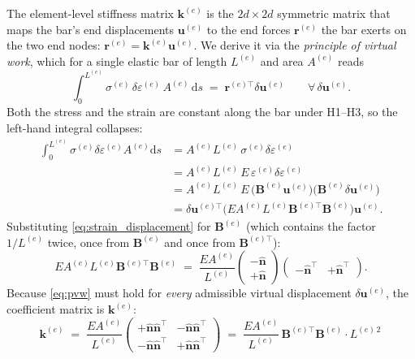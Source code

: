 The element-level stiffness matrix $\mathbf{k}^{(e)}$ is the
$2d\times 2d$ symmetric matrix that maps the bar's end
displacements $\mathbf{u}^{(e)}$ to the end forces
$\mathbf{r}^{(e)}$ the bar exerts on the two end nodes:
$\mathbf{r}^{(e)}=\mathbf{k}^{(e)}\mathbf{u}^{(e)}$. We derive
it via the \emph{principle of virtual work}, which for a single
elastic bar of length $L^{(e)}$ and area $A^{(e)}$ reads
\begin{equation}
  \int_0^{L^{(e)}}\!\!\sigma^{(e)}\,\delta\varepsilon^{(e)}\,A^{(e)}\,\mathrm{d}s
  \;=\;\mathbf{r}^{(e)\top}\delta\mathbf{u}^{(e)}
  \qquad\forall\,\delta\mathbf{u}^{(e)}.
  \label{eq:pvw}
\end{equation}
Both the stress and the strain are constant along the bar under
H1--H3, so the left-hand integral collapses:
\begin{align}
  \int_0^{L^{(e)}}\sigma^{(e)}\delta\varepsilon^{(e)}A^{(e)}\mathrm{d}s
  &= A^{(e)}L^{(e)}\,\sigma^{(e)}\delta\varepsilon^{(e)}
  \nonumber\\
  &= A^{(e)}L^{(e)}\,E\,\varepsilon^{(e)}\delta\varepsilon^{(e)}
  \nonumber\\
  &= A^{(e)}L^{(e)}\,E\,
     \bigl(\mathbf{B}^{(e)}\mathbf{u}^{(e)}\bigr)\!
     \bigl(\mathbf{B}^{(e)}\delta\mathbf{u}^{(e)}\bigr)
  \nonumber\\
  &= \delta\mathbf{u}^{(e)\top}\!
     \bigl(EA^{(e)}L^{(e)}\mathbf{B}^{(e)\top}\mathbf{B}^{(e)}\bigr)
     \mathbf{u}^{(e)}.
\end{align}
Substituting \cref{eq:strain_displacement} for
$\mathbf{B}^{(e)}$ (which contains the factor $1/L^{(e)}$ twice,
once from $\mathbf{B}^{(e)}$ and once from $\mathbf{B}^{(e)\top}$):
\begin{equation}
  EA^{(e)}L^{(e)}\mathbf{B}^{(e)\top}\mathbf{B}^{(e)}
  \;=\;\frac{EA^{(e)}}{L^{(e)}}
  \begin{pmatrix}-\hat{\mathbf{n}}\\+\hat{\mathbf{n}}\end{pmatrix}
  \begin{pmatrix}-\hat{\mathbf{n}}^\top & +\hat{\mathbf{n}}^\top\end{pmatrix}.
\end{equation}
Because \cref{eq:pvw} must hold for \emph{every} admissible
virtual displacement $\delta\mathbf{u}^{(e)}$, the coefficient
matrix is $\mathbf{k}^{(e)}$:
\begin{equation}
  \boxed{\;
  \mathbf{k}^{(e)}
  \;=\;\frac{EA^{(e)}}{L^{(e)}}
  \begin{pmatrix}
    +\hat{\mathbf{n}}\hat{\mathbf{n}}^\top & -\hat{\mathbf{n}}\hat{\mathbf{n}}^\top\\
    -\hat{\mathbf{n}}\hat{\mathbf{n}}^\top & +\hat{\mathbf{n}}\hat{\mathbf{n}}^\top
  \end{pmatrix}
  \;=\;\frac{EA^{(e)}}{L^{(e)}}\,
       \mathbf{B}^{(e)\top}\mathbf{B}^{(e)}\cdot L^{(e)\,2}\,
  }\;
  \label{eq:element_stiffness}
\end{equation}

